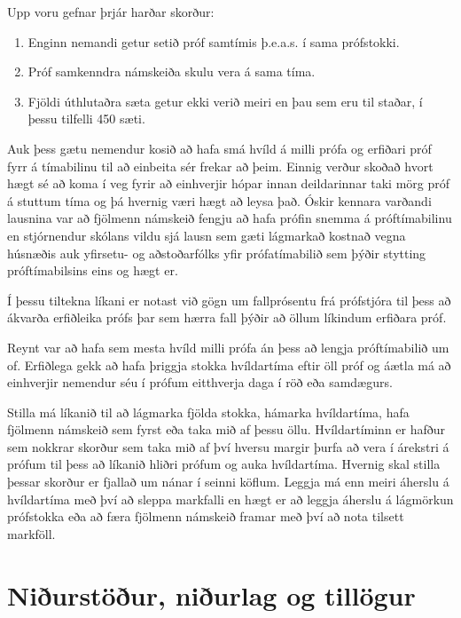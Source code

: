 \documentclass[12pt]{article}
\begin{document}
Upp voru gefnar þrjár harðar skorður:
\begin{enumerate}
	\item Enginn nemandi getur setið próf samtímis þ.e.a.s. í sama prófstokki.
	\item Próf samkenndra námskeiða skulu vera á sama tíma.
	\item Fjöldi úthlutaðra sæta getur ekki verið meiri en þau sem eru til staðar, í þessu tilfelli 450 sæti.
\end{enumerate}


Auk þess gætu nemendur kosið að hafa smá hvíld á milli prófa og erfiðari próf fyrr á tímabilinu til að einbeita sér frekar að þeim. Einnig verður skoðað hvort hægt sé að koma í veg fyrir að einhverjir hópar innan deildarinnar taki mörg próf á stuttum tíma og þá hvernig væri hægt að leysa það. Óskir kennara varðandi lausnina var að fjölmenn námskeið fengju að hafa prófin snemma á próftímabilinu en stjórnendur skólans vildu sjá lausn sem gæti lágmarkað kostnað vegna húsnæðis auk yfirsetu- og aðstoðarfólks yfir prófatímabilið sem þýðir stytting próftímabilsins eins og hægt er.

\medskip

Í þessu tiltekna líkani er notast við gögn um fallprósentu frá prófstjóra til þess að ákvarða erfiðleika prófs þar sem hærra fall þýðir að öllum líkindum erfiðara próf.

\medskip

Reynt var að hafa sem mesta hvíld milli prófa án þess að lengja próftímabilið um of. Erfiðlega gekk að hafa 
þriggja stokka hvíldartíma eftir öll próf og áætla má að einhverjir nemendur séu í prófum eitthverja daga í röð eða samdægurs.

\medskip


Stilla má líkanið til að lágmarka fjölda stokka, hámarka hvíldartíma, hafa fjölmenn námskeið sem fyrst eða taka mið af þessu öllu. Hvíldartíminn er hafður sem nokkrar skorður sem taka mið af því hversu margir þurfa að vera í árekstri á prófum til þess að líkanið hliðri prófum og auka hvíldartíma. Hvernig skal stilla þessar skorður er fjallað um nánar í seinni köflum. Leggja má enn meiri áherslu á hvíldartíma með því að sleppa markfalli en hægt er að leggja áherslu á lágmörkun prófstokka eða að færa fjölmenn námskeið framar með því að nota tilsett markföll.

\newpage	

\section{Niðurstöður, niðurlag og tillögur}
\end{document}
